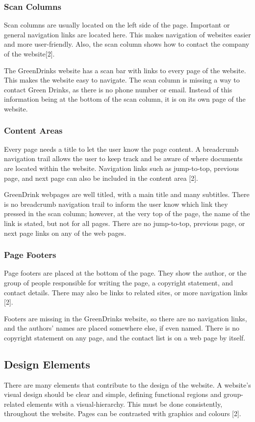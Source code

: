 \documentclass[12pt]{article}
\begin{document}
\subsubsection*{Scan Columns}	
Scan columns are usually located on the left side of the page. Important or general navigation links are located here. This makes navigation of websites easier and more user-friendly. Also, the scan column shows how to contact the company of the website[2].

The GreenDrinks website has a scan bar with links to every page of the website. This makes the website easy to navigate. The scan column is missing a way to contact Green Drinks, as there is no phone number or email. Instead of this information being at the bottom of the scan column, it is on its own page of the website.
\subsubsection*{Content Areas}	
Every page needs a title to let the user know the page content. A breadcrumb navigation trail allows the user to keep track and be aware of where documents are located within the website. Navigation links such as jump-to-top, previous page, and next page can also be included in the content area [2].

GreenDrink webpages are well titled, with a main title and many subtitles. There is no breadcrumb navigation trail to inform the user know which link they pressed in the scan column; however, at the very top of the page, the name of the link is stated, but not for all pages. There are no jump-to-top, previous page, or next page links on any of the web pages.

\subsubsection*{Page Footers}	
Page footers are placed at the bottom of the page. They show the author, or the group of people responsible for writing the page, a copyright statement, and contact details. There may also be links to related sites, or more navigation links [2].

Footers are missing in the GreenDrinks website, so there are no navigation links, and the authors’ names are placed somewhere else, if even named. There is no copyright statement on any page, and the contact list is on a web page by itself.
\subsection*{Design Elements}	
There are many elements that contribute to the design of the website. A website’s visual design should be clear and simple, defining functional regions and group-related elements with a visual-hierarchy. This must be done consistently, throughout the website. Pages can be contrasted with graphics and colours [2].
 
\end{document}

